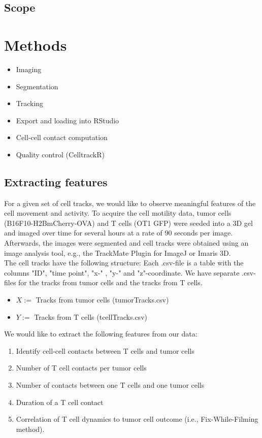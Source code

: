 \documentclass{report}
\begin{document}
\section{ Scope }

\chapter{Methods}

\begin{itemize}
	\item Imaging
	\item Segmentation
	\item Tracking
	\item Export and loading into RStudio
	\item Cell-cell contact computation
	\item Quality control (CelltrackR)
\end{itemize}

\section{Extracting features}

For a given set of cell tracks, we would like to observe meaningful features of the cell movement and activity. To acquire the cell motility data, tumor cells (B16F10-H2BmCherry-OVA) and T cells (OT1 GFP) were seeded into a 3D gel and imaged over time for several hours at a rate of 90 seconds per image. Afterwards, the images were segmented and cell tracks were obtained using an image analysis tool, e.g., the TrackMate Plugin for ImageJ or Imaris 3D.\\

The cell tracks have the following structure: Each .csv-file is a table with the columns "ID", "time point", "x-" , "y-" and "z"-coordinate. We have separate .csv-files for the tracks from tumor cells and the tracks from T cells.

\begin{itemize}
	\item  $X :=$ Tracks from tumor cells (tumorTracks.csv)
	\item $Y :=$ Tracks from T cells (tcellTracks.csv)
\end{itemize}

We would like to extract the following features from our data:
\begin{enumerate}
	\item Identify cell-cell contacts between T cells and tumor cells
	\item Number of T cell contacts per tumor cells
	\item Number of contacts between one T cells and one tumor cells
	\item Duration of a T cell contact
	\item Correlation of T cell dynamics to tumor cell outcome (i.e., Fix-While-Filming method).
\end{enumerate}
\end{document}
